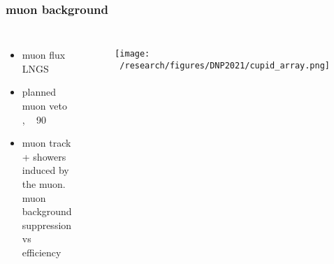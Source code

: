 \documentclass{beamer}
\begin{document}
	\begin{frame}
		\frametitle{muon background}
		\begin{columns}[c] %
			
			\begin{itemize}
				\item muon flux LNGS
				\item planned muon veto , ~ 90%
				\item muon track + showers induced by the muon. muon background suppression vs efficiency
			\end{itemize}
			
			\begin{figure}
			\texttt{[image: ~/research/figures/DNP2021/cupid\_array.png]}
			\caption{}
			\end{figure}
			
		\end{columns}
	\end{frame}


\end{document}
